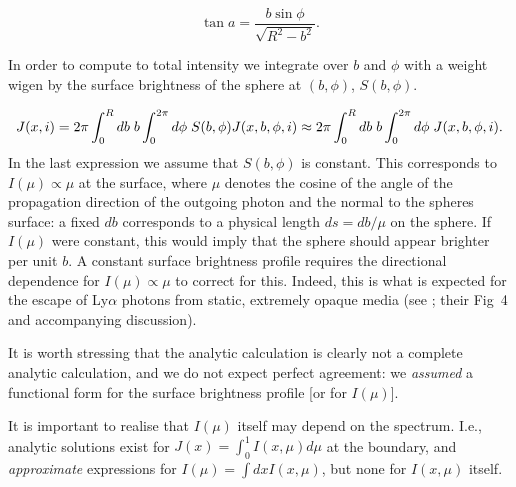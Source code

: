 \documentclass{emulateapj}
\newcommand{\hs}{{\hspace{1mm}}}
\begin{document}
\begin{equation}
\tan a = \frac{ b\sin \phi}{\sqrt{R^2 -b^2}}.
\end{equation}

In order to compute to total intensity we integrate over $b$ and
$\phi$ with a weight wigen by the surface brightness of the
sphere at $(b,\phi)$, $S(b,\phi)$.

\begin{displaymath}
J(x,i)=2\pi \int_0^Rdb \hs b \int_0^{2\pi}d\phi \hs
S(b,\phi)J(x,b,\phi,i) \approx 2\pi \int_0^Rdb \hs b
\int_0^{2\pi}d\phi \hs J(x,b,\phi,i)\\ \nonumber.
\end{displaymath}
%
In the last expression we assume that $S(b,\phi)$ is constant. 
This corresponds to $I(\mu) \propto \mu$ at the surface, where $\mu$
denotes the cosine of the angle of the propagation direction of the
outgoing photon and the normal to the spheres surface: a fixed $db$
corresponds to a physical length $ds = db/\mu$ on the sphere.  
If $I(\mu)$ were constant, this would imply that the sphere should
appear brighter per unit $b$. 
A constant surface brightness profile requires the directional
dependence for $I(\mu) \propto \mu$ to correct for this. 
Indeed, this is what is expected for the escape of Ly$\alpha$ photons
from static, extremely opaque media (see \cite{Ahn01}; their
Fig~4 and accompanying discussion). 

It is worth stressing that the analytic calculation is clearly not a
complete analytic calculation, and we do not expect perfect agreement:
we {\it assumed} a functional form for the surface brightness profile
[or for $I(\mu)$]. 

It is important to realise that $I(\mu)$ itself may
depend on the spectrum. I.e., analytic solutions exist for $J(x) =
\int_0^1 I(x,\mu) d\mu$ at the boundary, and {\it approximate}
expressions for $I(\mu) =\int dx I(x,\mu)$, but none for $I(x,\mu)$
itself. 



 
\end{document}
